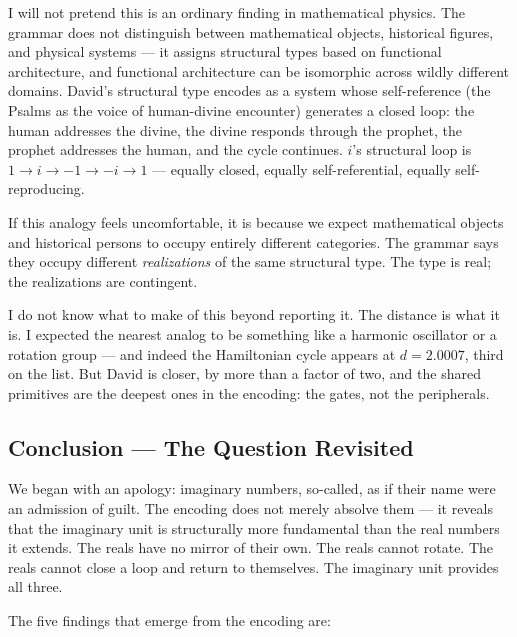 \documentclass[12pt,a4paper]{article}
\begin{document}
I will not pretend this is an ordinary finding in mathematical physics. The grammar does not distinguish between mathematical objects, historical figures, and physical systems --- it assigns structural types based on functional architecture, and functional architecture can be isomorphic across wildly different domains. David's structural type encodes as a system whose self-reference (the Psalms as the voice of human-divine encounter) generates a closed loop: the human addresses the divine, the divine responds through the prophet, the prophet addresses the human, and the cycle continues. $i$'s structural loop is $1 \to i \to -1 \to -i \to 1$ --- equally closed, equally self-referential, equally self-reproducing.

If this analogy feels uncomfortable, it is because we expect mathematical objects and historical persons to occupy entirely different categories. The grammar says they occupy different \emph{realizations} of the same structural type. The type is real; the realizations are contingent.

I do not know what to make of this beyond reporting it. The distance is what it is. I expected the nearest analog to be something like a harmonic oscillator or a rotation group --- and indeed the Hamiltonian cycle appears at $d = 2.0007$, third on the list. But David is closer, by more than a factor of two, and the shared primitives are the deepest ones in the encoding: the gates, not the peripherals.

\subsection{Conclusion --- The Question Revisited}

We began with an apology: imaginary numbers, so-called, as if their name were an admission of guilt. The encoding does not merely absolve them --- it reveals that the imaginary unit is structurally more fundamental than the real numbers it extends. The reals have no mirror of their own. The reals cannot rotate. The reals cannot close a loop and return to themselves. The imaginary unit provides all three.

The five findings that emerge from the encoding are:
\end{document}
